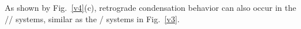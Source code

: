 As shown by Fig.~\ref{v4}(c), retrograde condensation behavior can also occur in the // systems, similar as the / systems in Fig.~\ref{v3}.

    


